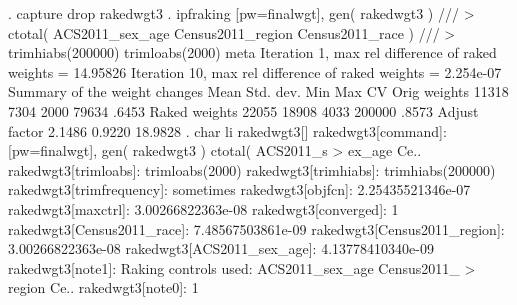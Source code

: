 . capture drop rakedwgt3
{\smallskip}
. ipfraking [pw=finalwgt], gen( rakedwgt3 ) ///
>     ctotal( ACS2011_sex_age Census2011_region Census2011_race ) ///
>     trimhiabs(200000) trimloabs(2000) meta
{\smallskip}
\cnp
 Iteration 1, max rel difference of raked weights = 14.95826
\oom
 Iteration 10, max rel difference of raked weights = 2.254e-07
{\smallskip}
   Summary of the weight changes
{\smallskip}
              {\VBAR}    Mean    Std. dev.    Min        Max       CV
Orig weights  {\VBAR}    11318       7304      2000       79634   .6453
Raked weights {\VBAR}    22055      18908      4033      200000   .8573
Adjust factor {\VBAR}   2.1486               0.9220     18.9828
{\smallskip}
. char li rakedwgt3[]
  rakedwgt3[command]:         [pw=finalwgt], gen( rakedwgt3 ) ctotal( ACS2011_s
> ex_age Ce..
  rakedwgt3[trimloabs]:       trimloabs(2000)
  rakedwgt3[trimhiabs]:       trimhiabs(200000)
  rakedwgt3[trimfrequency]:   sometimes
  rakedwgt3[objfcn]:          2.25435521346e-07
  rakedwgt3[maxctrl]:         3.00266822363e-08
  rakedwgt3[converged]:       1
  rakedwgt3[Census2011_race]: 7.48567503861e-09
  rakedwgt3[Census2011_region]:
                              3.00266822363e-08
  rakedwgt3[ACS2011_sex_age]: 4.13778410340e-09
  rakedwgt3[note1]:           Raking controls used: ACS2011_sex_age Census2011_
> region Ce..
  rakedwgt3[note0]:           1
{\smallskip}
